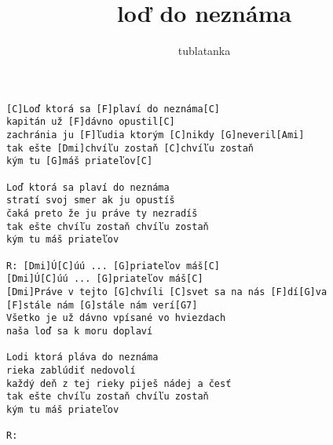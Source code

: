 \author{tublatanka}
\title{loď do neznáma}
\maketitle
\begin{verbatim}
[C]Loď ktorá sa [F]plaví do neznáma[C]
kapitán už [F]dávno opustil[C]
zachránia ju [F]ľudia ktorým [C]nikdy [G]neveril[Ami]
tak ešte [Dmi]chvíľu zostaň [C]chvíľu zostaň
kým tu [G]máš priateľov[C]

Loď ktorá sa plaví do neznáma
stratí svoj smer ak ju opustíš
čaká preto že ju práve ty nezradíš
tak ešte chvíľu zostaň chvíľu zostaň
kým tu máš priateľov

R: [Dmi]Ú[C]úú ... [G]priateľov máš[C]
[Dmi]Ú[C]úú ... [G]priateľov máš[C]
[Dmi]Práve v tejto [G]chvíli [C]svet sa na nás [F]dí[G]va
[F]stále nám [G]stále nám verí[G7]
Všetko je už dávno vpísané vo hviezdach
naša loď sa k moru doplaví

Lodi ktorá pláva do neznáma
rieka zablúdiť nedovolí
každý deň z tej rieky piješ nádej a česť
tak ešte chvíľu zostaň chvíľu zostaň
kým tu máš priateľov

R:
\end{verbatim}